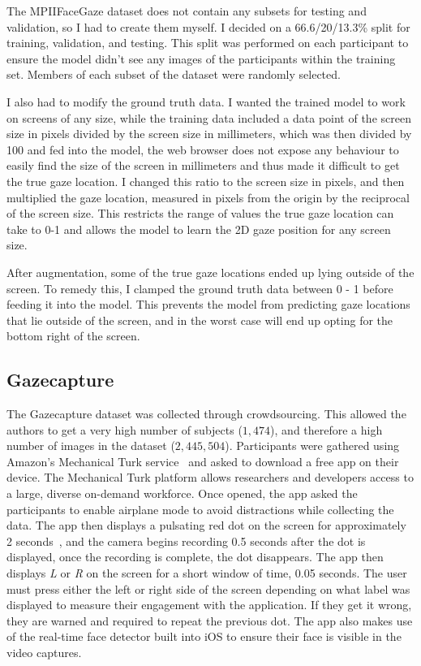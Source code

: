 \documentclass{report}
\begin{document}
The MPIIFaceGaze dataset does not contain any subsets for testing and validation, so I had to create them myself. I decided on a 66.6/20/13.3\% split for training, validation, and testing. This split was performed on each participant to ensure the model didn't see any images of the participants within the training set. Members of each subset of the dataset were randomly selected. 

I also had to modify the ground truth data. I wanted the trained model to work on screens of any size, while the training data included a data point of the screen size in pixels divided by the screen size in millimeters, which was then divided by 100 and fed into the model, the web browser does not expose any behaviour to easily find the size of the screen in millimeters and thus made it difficult to get the true gaze location. I changed this ratio to the screen size in pixels, and then multiplied the gaze location, measured in pixels from the origin by the reciprocal of the screen size. This restricts the range of values the true gaze location can take to 0-1 and allows the model to learn the 2D gaze position for any screen size. 

After augmentation, some of the true gaze locations ended up lying outside of the screen. To remedy this, I clamped the ground truth data between 0 - 1 before feeding it into the model. This prevents the model from predicting gaze locations that lie outside of the screen, and in the worst case will end up opting for the bottom right of the screen. 

\subsection{Gazecapture}\label{sec:gazecapture}

The Gazecapture dataset was collected through crowdsourcing. This allowed the authors to get a very high number of subjects ($1,474$), and therefore a high number of images in the dataset ($2,445,504$). Participants were gathered using Amazon's Mechanical Turk service~\cite{mturk} and asked to download a free app on their device. The Mechanical Turk platform allows researchers and developers access to a large, diverse on-demand workforce. Once opened, the app asked the participants to enable airplane mode to avoid distractions while collecting the data. The app then displays a pulsating red dot on the screen for approximately 2 seconds~\cite{krafka2016eye}, and the camera begins recording 0.5 seconds after the dot is displayed, once the recording is complete, the dot disappears. The app then displays \textit{L} or \textit{R} on the screen for a short window of time, 0.05 seconds. The user must press either the left or right side of the screen depending on what label was displayed to measure their engagement with the application. If they get it wrong, they are warned and required to repeat the previous dot. The app also makes use of the real-time face detector built into iOS to ensure their face is visible in the video captures.
\end{document}
